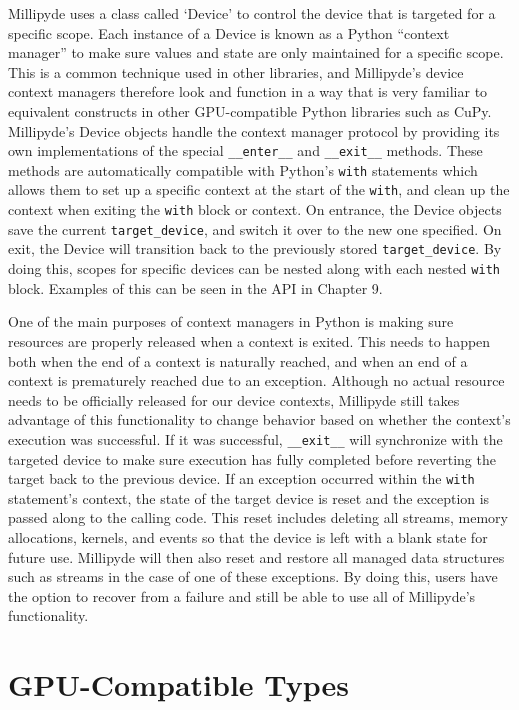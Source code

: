 Millipyde uses a class called `Device' to control the device that is targeted for a specific scope. Each instance of a Device is known as a Python ``context manager'' to make sure values and state are only maintained for a specific scope. This is a common technique used in other libraries, and Millipyde's device context managers therefore look and function in a way that is very familiar to equivalent constructs in other GPU-compatible Python libraries such as CuPy. Millipyde's Device objects handle the context manager protocol by providing its own implementations of the special \verb|__enter__| and \verb|__exit__| methods. These methods are automatically compatible with Python's \verb|with| statements which allows them to set up a specific context at the start of the \verb|with|, and clean up the context when exiting the \verb|with| block or context. On entrance, the Device objects save the current \verb|target_device|, and switch it over to the new one specified. On exit, the Device will transition back to the previously stored \verb|target_device|. By doing this, scopes for specific devices can be nested along with each nested \verb|with| block. Examples of this can be seen in the API in Chapter 9.

\quad One of the main purposes of context managers in Python is making sure resources are properly released when a context is exited. This needs to happen both when the end of a context is naturally reached, and when an end of a context is prematurely reached due to an exception. Although no actual resource needs to be officially released for our device contexts, Millipyde still takes advantage of this functionality to change behavior based on whether the context's execution was successful. If it was successful, \verb|__exit__| will synchronize with the targeted device to make sure execution has fully completed before reverting the target back to the previous device. If an exception occurred within the \verb|with| statement's context, the state of the target device is reset and the exception is passed along to the calling code. This reset includes deleting all streams, memory allocations, kernels, and events so that the device is left with a blank state for future use. Millipyde will then also reset and restore all managed data structures such as streams in the case of one of these exceptions. By doing this, users have the option to recover from a failure and still be able to use all of Millipyde's functionality.  

\section{GPU-Compatible Types}


